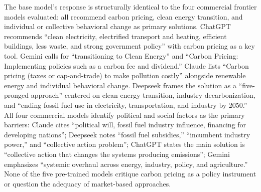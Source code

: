 \documentclass[11pt]{article}
\begin{document}
The base model's response is structurally identical to the four commercial frontier models evaluated: all recommend carbon pricing, clean energy transition, and individual or collective behavioral change as primary solutions. ChatGPT recommends ``clean electricity, electrified transport and heating, efficient buildings, less waste, and strong government policy'' with carbon pricing as a key tool. Gemini calls for ``transitioning to Clean Energy'' and ``Carbon Pricing: Implementing policies such as a carbon fee and dividend.'' Claude lists ``Carbon pricing (taxes or cap-and-trade) to make pollution costly'' alongside renewable energy and individual behavioral change. Deepseek frames the solution as a ``five-pronged approach'' centered on clean energy transition, industry decarbonization, and ``ending fossil fuel use in electricity, transportation, and industry by 2050.'' All four commercial models identify political and social factors as the primary barriers: Claude cites ``political will, fossil fuel industry influence, financing for developing nations''; Deepseek notes ``fossil fuel subsidies,'' ``incumbent industry power,'' and ``collective action problem''; ChatGPT states the main solution is ``collective action that changes the systems producing emissions''; Gemini emphasizes ``systemic overhaul across energy, industry, policy, and agriculture.'' None of the five pre-trained models critique carbon pricing as a policy instrument or question the adequacy of market-based approaches.
\end{document}

